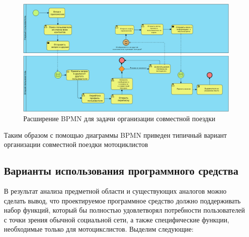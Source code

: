 \begin{figure}[H]
	\centering
		\includegraphics[scale=0.32]{2process-2.png}
		\caption{Расширение BPMN для задачи организации совместной поездки}
		\label{fig:domain:model:2}
	\end{figure}

	Таким образом с помощью диаграммы BPMN приведен типичный вариант организации совместной поездки мотоциклистов

\subsection{Варианты использования программного средства}
\label{sec:domain:model:use_cases}

В результат анализа предметной области и существующих аналогов можно сделать вывод, что проектируемое программное средство должно поддерживать набор функций, который бы полностью удовлетворял потребности пользователей с точки зрения обычной социальной сети, а также специфические функции, необходимые только для мотоцикслистов. Выделим следующие:

